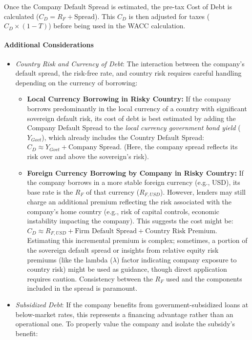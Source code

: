 Once the Company Default Spread is estimated, the pre-tax Cost of Debt is calculated (\(C_D = R_F + \text{Spread}\)). This \(C_D\) is then adjusted for taxes (\(C_D \times (1-T)\)) before being used in the WACC calculation.

\paragraph{Additional Considerations}
\begin{itemize}
    \item \textit{Country Risk and Currency of Debt}: The interaction between the company's default spread, the risk-free rate, and country risk requires careful handling depending on the currency of borrowing:
          \begin{itemize}
              \item \textbf{Local Currency Borrowing in Risky Country:} If the company borrows predominantly in the local currency of a country with significant sovereign default risk, its cost of debt is best estimated by adding the Company Default Spread to the \textit{local currency government bond yield} (\(Y_{Govt}\)), which already includes the Country Default Spread: \(C_D \approx Y_{Govt} + \text{Company Spread}\). (Here, the company spread reflects its risk over and above the sovereign's risk).
              \item \textbf{Foreign Currency Borrowing by Company in Risky Country:} If the company borrows in a more stable foreign currency (e.g., USD), its base rate is the \(R_F\) of that currency (\(R_{F,USD}\)). However, lenders may still charge an additional premium reflecting the risk associated with the company's home country (e.g., risk of capital controls, economic instability impacting the company). This suggests the cost might be:\\
                    \(C_D \approx R_{F,USD} + \text{Firm Default Spread} + \text{Country Risk Premium}\). Estimating this incremental premium is complex; sometimes, a portion of the sovereign default spread or insights from relative equity risk premiums (like the lambda (\(\lambda\)) factor indicating company exposure to country risk) might be used as guidance, though direct application requires caution. Consistency between the \(R_F\) used and the components included in the spread is paramount.
          \end{itemize}
    \item \textit{Subsidized Debt}: If the company benefits from government-subsidized loans at below-market rates, this represents a financing advantage rather than an operational one. To properly value the company and isolate the subsidy's benefit:

\end{itemize}
